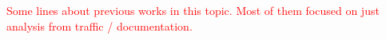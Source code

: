 \textcolor{red}{Some lines about previous works in this topic. Most of them focused on just analysis from traffic / documentation. }